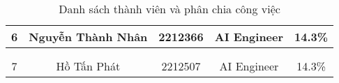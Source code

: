 \begin{table}[H]
\begin{tabular}{|c|c|c|c|c|}
\multirow{-3}{*}{6} & \multirow{-3}{*}{Nguyễn Thành Nhân}       & \multirow{-3}{*}{2212366}         & \multirow{-3}{3cm}{\centering AI Engineer}                & \multirow{-3}{*}{14.3\%}                                        \\ \hline
                    &                                           &                                   &                                                           &                                                                   \\ 
                    &                                           &                                   &                                                           &                                                                   \\  
\multirow{-3}{*}{7} & \multirow{-3}{*}{Hồ Tấn Phát}             & \multirow{-3}{*}{2212507}         & \multirow{-3}{3cm}{\centering AI Engineer}                & \multirow{-3}{*}{14.3\%}                                        \\ \hline
\end{tabular}
\caption{Danh sách thành viên và phân chia công việc}
\end{table}

\newpage